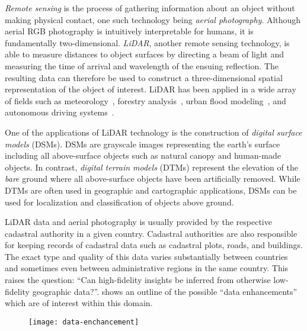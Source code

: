 \textit{Remote sensing} is the process of gathering information about an object without making physical contact, one such technology being \textit{aerial photography}.
Although aerial RGB photography is intuitively interpretable for humans, it is fundamentally two-dimensional.
\textit{LiDAR}, another remote sensing technology, is able to measure distances to object surfaces by directing a beam of light and measuring the time of arrival and wavelength of the ensuing reflection.
The resulting data can therefore be used to construct a three-dimensional spatial representation of the object of interest.
LiDAR has been applied in a wide array of fields such as meteorology~\cite{lidar_meteorology_1966}, forestry analysis~\cite{lidar_forestry_2000}, urban flood modeling~\cite{lidar_flood_2013}, and autonomous driving systems~\cite{lidar_self_driving_2018}.

One of the applications of LiDAR technology is the construction of \textit{digital surface models} (DSMs).
DSMs are grayscale images representing the earth's surface including all above-surface objects such as natural canopy and human-made objects.
In contrast, \textit{digital terrain models} (DTMs) represent the elevation of the \textit{bare} ground where all above-surface objects have been artificially removed.
While DTMs are often used in geographic and cartographic applications, DSMs can be used for localization and classification of objects above ground.

LiDAR data and aerial photography is usually provided by the respective cadastral authority in a given country.
Cadastral authorities are also responsible for keeping records of cadastral data such as cadastral plots, roads, and buildings.
The exact type and quality of this data varies substantially between countries and sometimes even between administrative regions in the same country.
This raises the question: \enquote{Can high-fidelity insights be inferred from otherwise low-fidelity geographic data?}.
 shows an outline of the possible \enquote{data enhancements} which are of interest within this domain. %

\begin{figure}
  \texttt{[image: data-enchancement]}
  \label{fig:data-enchancement}
\end{figure}

